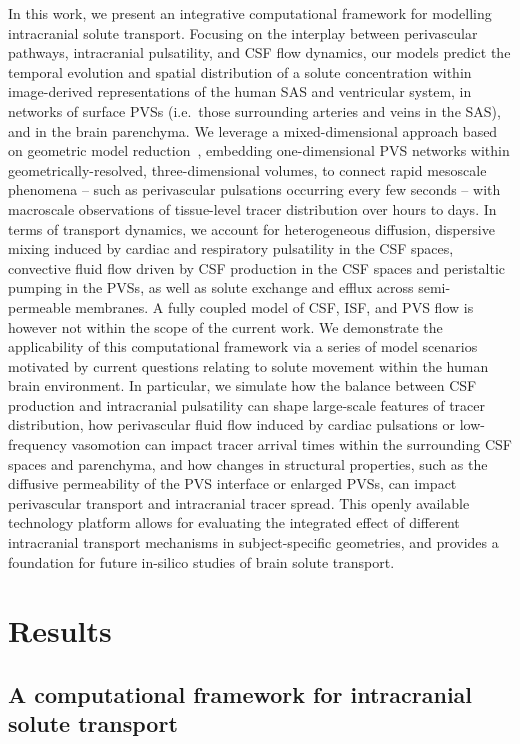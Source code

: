 \documentclass[fleqn,10pt]{wlscirep}
\begin{document}
In this work, we present an integrative computational framework for
modelling intracranial solute transport. Focusing on the interplay
between perivascular pathways, intracranial pulsatility, and CSF flow
dynamics, our models predict the temporal evolution and spatial
distribution of a solute concentration within image-derived
representations of the human SAS and ventricular system, in networks
of surface PVSs (i.e.~those surrounding arteries and veins in the
SAS), and in the brain parenchyma. We leverage a mixed-dimensional
approach based on geometric model reduction~\cite{masri2024modelling},
embedding one-dimensional PVS networks within geometrically-resolved,
three-dimensional volumes, to connect rapid mesoscale phenomena --
such as perivascular pulsations occurring every few seconds -- with
macroscale observations of tissue-level tracer distribution over hours
to days. In terms of transport dynamics, we account for heterogeneous
diffusion, dispersive mixing induced by cardiac and respiratory
pulsatility in the CSF spaces, convective fluid flow driven by CSF
production in the CSF spaces and peristaltic pumping in the PVSs, as
well as solute exchange and efflux across semi-permeable membranes. A
fully coupled model of CSF, ISF, and PVS flow is however not within the
scope of the current work. We demonstrate the applicability of this
computational framework via a series of model scenarios motivated by
current questions relating to solute movement within the human brain
environment. In particular, we simulate how the balance between CSF
production and intracranial pulsatility can shape large-scale features
of tracer distribution, how perivascular fluid flow induced by cardiac
pulsations or low-frequency vasomotion can impact tracer arrival times
within the surrounding CSF spaces and parenchyma, and how changes in
structural properties, such as the diffusive permeability of the PVS
interface or enlarged PVSs, can impact perivascular transport and
intracranial tracer spread. This openly available technology
platform\cite{ZENODO} allows for evaluating the integrated effect of
different intracranial transport mechanisms in subject-specific
geometries, and provides a foundation for future in-silico studies of
brain solute transport.

\section*{Results}

\subsection*{A computational framework for intracranial solute transport}
\end{document}
